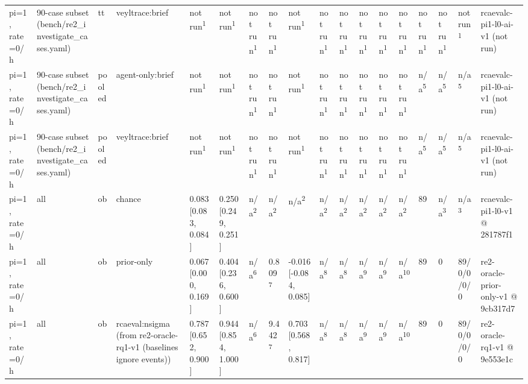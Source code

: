 \begin{table}[t]
\begin{tabular}{llllllllllllllllll}
pi=1, rate=0/h & 90-case subset (bench/re2\_investigate\_cases.yaml) & tt & veyltrace:brief & not run\textsuperscript{1} & not run\textsuperscript{1} & not run\textsuperscript{1} & not run\textsuperscript{1} & not run\textsuperscript{1} & not run\textsuperscript{1} & not run\textsuperscript{1} & not run\textsuperscript{1} & not run\textsuperscript{1} & not run\textsuperscript{1} & not run\textsuperscript{1} & not run\textsuperscript{1} & not run\textsuperscript{1} & rcaevalc-pi1-l0-ai-v1 (not run) \\
pi=1, rate=0/h & 90-case subset (bench/re2\_investigate\_cases.yaml) & pooled & agent-only:brief & not run\textsuperscript{1} & not run\textsuperscript{1} & not run\textsuperscript{1} & not run\textsuperscript{1} & not run\textsuperscript{1} & not run\textsuperscript{1} & not run\textsuperscript{1} & not run\textsuperscript{1} & not run\textsuperscript{1} & not run\textsuperscript{1} & n/a\textsuperscript{5} & n/a\textsuperscript{5} & n/a\textsuperscript{5} & rcaevalc-pi1-l0-ai-v1 (not run) \\
pi=1, rate=0/h & 90-case subset (bench/re2\_investigate\_cases.yaml) & pooled & veyltrace:brief & not run\textsuperscript{1} & not run\textsuperscript{1} & not run\textsuperscript{1} & not run\textsuperscript{1} & not run\textsuperscript{1} & not run\textsuperscript{1} & not run\textsuperscript{1} & not run\textsuperscript{1} & not run\textsuperscript{1} & not run\textsuperscript{1} & n/a\textsuperscript{5} & n/a\textsuperscript{5} & n/a\textsuperscript{5} & rcaevalc-pi1-l0-ai-v1 (not run) \\
pi=1, rate=0/h & all & ob & chance & 0.083 [0.083, 0.084] & 0.250 [0.249, 0.251] & n/a\textsuperscript{2} & n/a\textsuperscript{2} & n/a\textsuperscript{2} & n/a\textsuperscript{2} & n/a\textsuperscript{2} & n/a\textsuperscript{2} & n/a\textsuperscript{2} & n/a\textsuperscript{2} & 89 & n/a\textsuperscript{3} & n/a\textsuperscript{3} & rcaevalc-pi1-l0-v1 @ 281787f1 \\
pi=1, rate=0/h & all & ob & prior-only & 0.067 [0.000, 0.169] & 0.404 [0.236, 0.600] & n/a\textsuperscript{6} & 0.809\textsuperscript{7} & -0.016 [-0.084, 0.085] & n/a\textsuperscript{8} & n/a\textsuperscript{8} & n/a\textsuperscript{9} & n/a\textsuperscript{9} & n/a\textsuperscript{10} & 89 & 0 & 89/0/0/0/0 & re2-oracle-prior-only-v1 @ 9cb317d7 \\
pi=1, rate=0/h & all & ob & rcaeval:nsigma (from re2-oracle-rq1-v1 (baselines ignore events)) & 0.787 [0.652, 0.900] & 0.944 [0.854, 1.000] & n/a\textsuperscript{6} & 9.442\textsuperscript{7} & 0.703 [0.568, 0.817] & n/a\textsuperscript{8} & n/a\textsuperscript{8} & n/a\textsuperscript{9} & n/a\textsuperscript{9} & n/a\textsuperscript{10} & 89 & 0 & 89/0/0/0/0 & re2-oracle-rq1-v1 @ 9e553e1c \\

\end{tabular}
\end{table}
